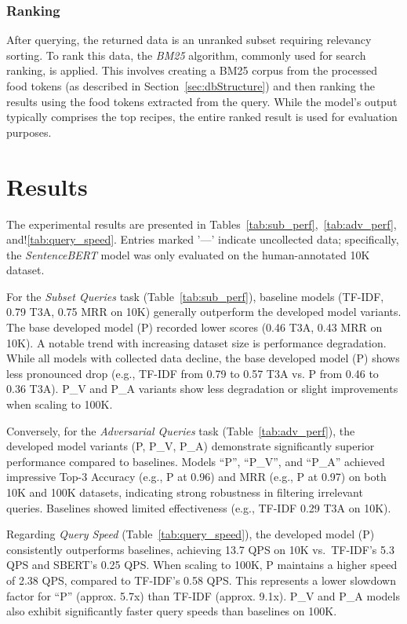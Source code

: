\documentclass[11pt]{article}
\begin{document}
\subsubsection{Ranking}
After querying, the returned data is an unranked subset requiring relevancy
sorting.
To rank this data, the \emph{BM25} algorithm, commonly used for search ranking,
is applied.
This involves creating a BM25 corpus from the processed food tokens (as
described in Section~\ref{sec:dbStructure}) and then ranking the results using
the food tokens extracted from the query.
While the model's output typically comprises the top recipes, the entire ranked
result is used for evaluation purposes.

\section{Results}\label{sec:res}
The experimental results are presented in
Tables~\ref{tab:sub_perf},~\ref{tab:adv_perf}, and!\ref{tab:query_speed}.
Entries marked '---' indicate uncollected data; specifically, the
\emph{SentenceBERT} model was only evaluated on the human-annotated 10K
dataset.

For the \emph{Subset Queries} task (Table~\ref{tab:sub_perf}), baseline models
(TF-IDF, 0.79 T3A, 0.75 MRR on 10K) generally outperform the developed model
variants.
The base developed model (P) recorded lower scores (0.46 T3A, 0.43 MRR on 10K).
A notable trend with increasing dataset size is performance degradation.
While all models with collected data decline, the base developed model (P) shows
less pronounced drop (e.g., TF-IDF from 0.79 to 0.57 T3A vs. P from 0.46 to 0.36
T3A). P\_V and P\_A variants show less degradation or slight improvements when
scaling to 100K.

Conversely, for the \emph{Adversarial Queries} task (Table~\ref{tab:adv_perf}),
the developed model variants (P, P\_V, P\_A) demonstrate significantly superior
performance compared to baselines.
Models ``P'', ``P\_V'', and ``P\_A'' achieved impressive Top-3 Accuracy (e.g., P at
0.96) and MRR (e.g., P at 0.97) on both 10K and 100K datasets, indicating strong
robustness in filtering irrelevant queries.
Baselines showed limited effectiveness (e.g., TF-IDF 0.29 T3A on 10K).

Regarding \emph{Query Speed} (Table~\ref{tab:query_speed}), the developed model
(P) consistently outperforms baselines, achieving 13.7 QPS on 10K vs.\ TF-IDF's
5.3 QPS and SBERT's 0.25 QPS\@.
When scaling to 100K, P maintains a higher speed of 2.38 QPS, compared to
TF-IDF's 0.58 QPS\@.
This represents a lower slowdown factor for ``P'' (approx. 5.7x) than TF-IDF
(approx. 9.1x). P\_V and P\_A models also exhibit significantly faster query
speeds than baselines on 100K.
\end{document}
